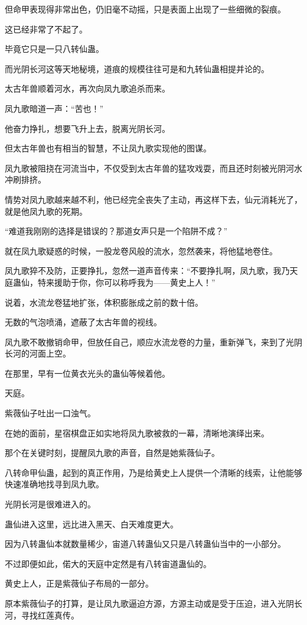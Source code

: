 \begin{this_body}
但命甲表现得非常出色，仍旧毫不动摇，只是表面上出现了一些细微的裂痕。

这已经非常了不起了。

毕竟它只是一只八转仙蛊。

而光阴长河这等天地秘境，道痕的规模往往可是和九转仙蛊相提并论的。

太古年兽顺着河水，再次向凤九歌追杀而来。

凤九歌暗道一声：“苦也！”

他奋力挣扎，想要飞升上去，脱离光阴长河。

但太古年兽也有相当的智慧，不让凤九歌实现他的图谋。

凤九歌被阻挠在河流当中，不仅受到太古年兽的猛攻戏耍，而且还时刻被光阴河水冲刷排挤。

情势对凤九歌越来越不利，他已经完全丧失了主动，再这样下去，仙元消耗光了，就是他凤九歌的死期。

“难道我刚刚的选择是错误的？那道女声只是一个陷阱不成？”

就在凤九歌疑惑的时候，一股龙卷风般的流水，忽然袭来，将他猛地卷住。

凤九歌猝不及防，正要挣扎，忽然一道声音传来：“不要挣扎啊，凤九歌，我乃天庭蛊仙，特来援助于你，你可以称呼我为——黄史上人！”

说着，水流龙卷猛地扩张，体积膨胀成之前的数十倍。

无数的气泡喷涌，遮蔽了太古年兽的视线。

凤九歌不敢撤销命甲，但放任自己，顺应水流龙卷的力量，重新弹飞，来到了光阴长河的河面上空。

在那里，早有一位黄衣光头的蛊仙等候着他。

天庭。

紫薇仙子吐出一口浊气。

在她的面前，星宿棋盘正如实地将凤九歌被救的一幕，清晰地演绎出来。

那个在关键时刻，提醒凤九歌的声音，自然是她紫薇仙子。

八转命甲仙蛊，起到的真正作用，乃是给黄史上人提供一个清晰的线索，让他能够快速准确地找寻到凤九歌。

光阴长河是很难进入的。

蛊仙进入这里，远比进入黑天、白天难度更大。

因为八转蛊仙本就数量稀少，宙道八转蛊仙又只是八转蛊仙当中的一小部分。

不过即便如此，偌大的天庭中定然是有八转宙道蛊仙的。

黄史上人，正是紫薇仙子布局的一部分。

原本紫薇仙子的打算，是让凤九歌逼迫方源，方源主动或是受于压迫，进入光阴长河，寻找红莲真传。


\end{this_body}
